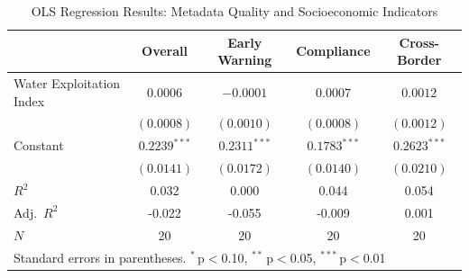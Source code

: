 \begin{table}[htbp]
\centering
\caption{OLS Regression Results: Metadata Quality and Socioeconomic Indicators}
\label{tab:regression}
\begin{tabular}{lcccc}
\toprule
& \textbf{Overall} & \textbf{Early Warning} & \textbf{Compliance} & \textbf{Cross-Border} \\
\midrule
Water Exploitation Index & $0.0006$ & $-0.0001$ & $0.0007$ & $0.0012$ \\
 & $(0.0008)$ & $(0.0010)$ & $(0.0008)$ & $(0.0012)$ \\
Constant & $0.2239^{***}$ & $0.2311^{***}$ & $0.1783^{***}$ & $0.2623^{***}$ \\
 & $(0.0141)$ & $(0.0172)$ & $(0.0140)$ & $(0.0210)$ \\
\midrule
$R^2$ & 0.032 & 0.000 & 0.044 & 0.054 \\
Adj.\ $R^2$ & -0.022 & -0.055 & -0.009 & 0.001 \\
$N$ & 20 & 20 & 20 & 20 \\
\bottomrule
\multicolumn{5}{l}{\footnotesize Standard errors in parentheses. $^{*}$\,p$<$0.10, $^{**}$\,p$<$0.05, $^{***}$\,p$<$0.01}} \\
\end{tabular}
\end{table}